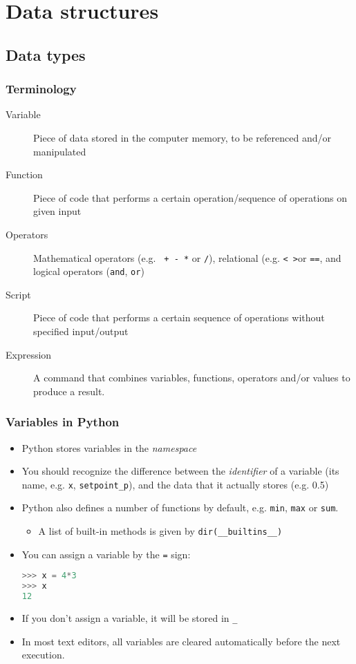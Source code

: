 \section{Data structures}
\subsection{Data types}
\begin{frame}[fragile]
 \frametitle{Terminology}
 \begin{description}
  \item[Variable] Piece of data stored in the computer memory, to be referenced and/or manipulated
  \item[Function] Piece of code that performs a certain operation/sequence of operations on given input
  \item[Operators] Mathematical operators (e.g. \lstinline$ + - *$ or \lstinline$/$), relational (e.g. \lstinline$< >$or \lstinline$==$, and logical operators (\lstinline$and$, \lstinline$or$)
  \item[Script] Piece of code that performs a certain sequence of operations without specified input/output
  \item[Expression] A command that combines variables, functions, operators and/or values to produce a result.
 \end{description}
\end{frame}

\begin{frame}[fragile]
 \frametitle{Variables in Python}
  \begin{itemize}
    \item Python stores variables in the \emph{namespace}
    \item You should recognize the difference between the \emph{identifier} of a variable (its name, e.g. \lstinline$x$, \lstinline$setpoint_p$), and the data that it actually stores (e.g. 0.5)
    \item Python also defines a number of functions by default, e.g. \lstinline$min$, \lstinline$max$ or \lstinline$sum$.
    \begin{itemize}
      \item A list of built-in methods is given by \lstinline$dir(__builtins__)$
    \end{itemize}
    \item You can assign a variable by the \lstinline$=$ sign:
   \begin{lstlisting}[language=Python, numbers=none]
>>> x = 4*3
>>> x
12
   \end{lstlisting}
   \item If you don't assign a variable, it will be stored in \lstinline$_$
   \item In most text editors, all variables are cleared automatically before the next execution. 
 \end{itemize}
\end{frame}

